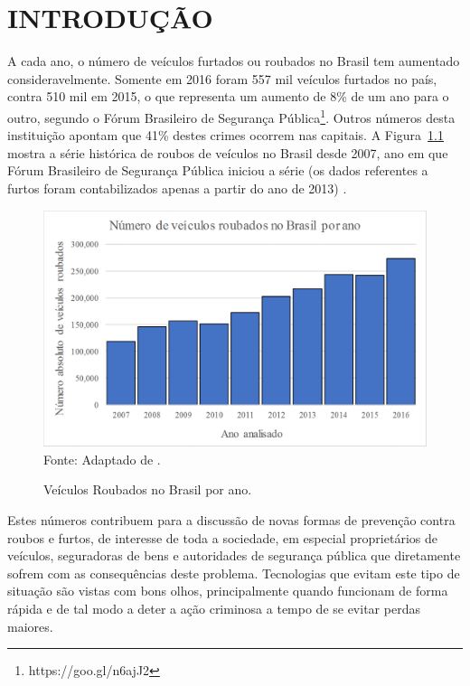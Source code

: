\chapter{INTRODUÇÃO}

A cada ano, o número de veículos furtados ou roubados no Brasil tem aumentado consideravelmente. Somente em 2016 foram 557 mil veículos furtados no país, contra 510 mil em 2015, o que representa um aumento de 8\% de um ano para o outro, segundo o Fórum Brasileiro de Segurança Pública\footnote[1]{https://goo.gl/n6ajJ2}. Outros números desta instituição apontam que 41\% destes crimes ocorrem nas capitais. A Figura~\ref{fig:roubos} mostra a série histórica de roubos de veículos no Brasil desde 2007, ano em que Fórum Brasileiro de Segurança Pública iniciou a série (os dados referentes a furtos foram contabilizados apenas a partir do ano de 2013) \cite{fbsp2017}.

\begin{figure}[!htb]
\centering
\caption{Veículos Roubados no Brasil por ano.} %
\includegraphics[scale=0.4]{roubosporano.png}\\  %
{\small Fonte: Adaptado de .} %
\label{fig:roubos} %
\end{figure}

Estes números contribuem para a discussão de novas formas de prevenção contra roubos e furtos, de interesse de toda a sociedade, em especial proprietários de veículos, seguradoras de bens e autoridades de segurança pública que diretamente sofrem com as consequências deste problema. Tecnologias que evitam este tipo de situação são vistas com bons olhos, principalmente quando funcionam de forma rápida e de tal modo a deter a ação criminosa a tempo de se evitar perdas maiores.

